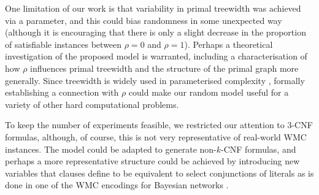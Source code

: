One limitation of our work is that variability in primal treewidth was achieved
via a parameter, and this could bias randomness in some unexpected way (although
it is encouraging that there is only a slight decrease in the proportion of
satisfiable instances between $\rho=0$ and $\rho = 1$). Perhaps a theoretical
investigation of the proposed model is warranted, including a characterisation
of how $\rho$ influences primal treewidth and the structure of the primal graph
more generally. Since treewidth is widely used in parameterised complexity
\citep{DBLP:series/txcs/DowneyF13}, formally establishing a connection with
$\rho$ could make our random model useful for a variety of other hard
computational problems.

To keep the number of experiments feasible, we restricted our attention to 3-CNF
formulas, although, of course, this is not very representative of real-world WMC
instances. The model could be adapted to generate non-$k$-CNF formulas, and
perhaps a more representative structure could be achieved by introducing new
variables that clauses define to be equivalent to select conjunctions of
literals as is done in one of the WMC encodings for Bayesian networks
\citep{DBLP:conf/kr/Darwiche02}.

